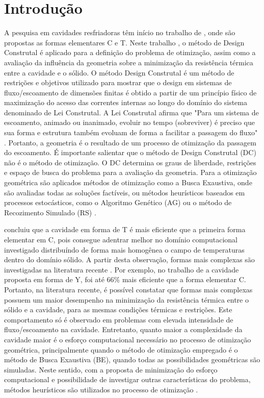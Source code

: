 \documentclass[12pt,A4,A4pt]{article}
\begin{document}
\newpage
 \onehalfspacing
\section{Introdução}

 {\fontsize{12pt}{\baselineskip}\selectfont}
 
\hspace{0.5cm}A pesquisa em cavidades resfriadoras têm início no trabalho de \cite{Biserni2004}, onde são propostas as formas elementares C e T. Neste trabalho \citep{Biserni2004}, o método de Design Construtal é aplicado para a definição do problema de otimização, assim como a avaliação da influência da geometria sobre a minimização da resistência térmica entre a cavidade e o sólido. O método Design Construtal é um método de restrições e objetivos utilizado para mostrar que o design em sistemas de fluxo/escoamento de dimensões finitas é obtido a partir de um princípio físico de maximização do acesso das correntes internas ao longo do domínio do sistema denominado de Lei Construtal. A Lei Construtal afirma que "Para um sistema de escoamento, animado ou inanimado, evoluir no tempo (sobreviver) é preciso que sua forma e estrutura também evoluam de forma a facilitar a passagem do fluxo" \citep{Bejan}. Portanto, a geometria é o resultado de um processo de otimização da passagem do escoamento. É importante salientar que o método de Design Construtal (DC) não é o método de otimização. O DC determina os graus de liberdade, restrições e espaço de busca do problema para a avaliação da geometria. Para a otimização geométrica são aplicados métodos de otimização como a Busca Exaustiva, onde são avaliadas todas as soluções factíveis, ou métodos heurísticos baseados em processos estocásticos, como o Algoritmo Genético (AG) ou o método de Recozimento Simulado (RS) \citep{Lorenzini2014,Gonzales2015energy}.

\cite{Biserni2004} concluiu que a cavidade em forma de T é mais eficiente que a primeira forma elementar em C, pois consegue adentrar melhor no domínio computacional investigado distribuíndo de forma mais homogênea o campo de temperaturas dentro do domínio sólido. A partir desta observação, formas mais complexas são investigadas na literatura recente \citep{Biserni2007,Lorenzini2011,Lorenzini2014,Biserni2017}. Por exemplo, no trabalho de \cite{Lorenzini2011} a cavidade proposta em forma de Y, foi até 66\% mais eficiente que a forma elementar C. Portanto, na literatura recente, é possível constatar que formas mais complexas possuem um maior desempenho na minimização da resistência térmica entre o sólido e a cavidade, para as mesmas condições térmicas e restrições. Este comportamento só é observado em problemas com elevada intensidade de fluxo/escoamento na cavidade. Entretanto, quanto maior a complexidade da cavidade maior é o esforço computacional necessário no processo de otimização geométrica, principalmente quando o método de otimização empregado é o método de Busca Exaustiva (BE), quando todas as possibilidades geométricas são simuladas. Neste sentido, com a proposta de minimização do esforço computacional e possibilidade de investigar outras características do problema, métodos heurísticos são utilizados no processo de otimização \citep{Lorenzini2014, Gonzales2015energy, Gonzales2017, Biserni2017}.
\end{document}
